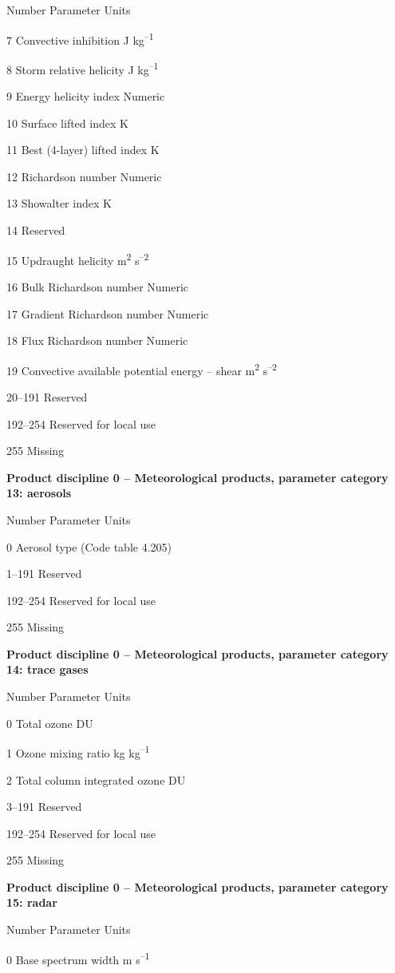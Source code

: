 Number Parameter Units

7 Convective inhibition J kg\textsuperscript{--1}

8 Storm relative helicity J kg\textsuperscript{--1}

9 Energy helicity index Numeric

10 Surface lifted index K

11 Best (4-layer) lifted index K

12 Richardson number Numeric

13 Showalter index K

14 Reserved

15 Updraught helicity m\textsuperscript{2} s\textsuperscript{--2}

16 Bulk Richardson number Numeric

17 Gradient Richardson number Numeric

18 Flux Richardson number Numeric

19 Convective available potential energy -- shear m\textsuperscript{2} s\textsuperscript{--2}

20--191 Reserved

192--254 Reserved for local use

255 Missing

\textbf{Product discipline 0 -- Meteorological products, parameter category 13: aerosols}

Number Parameter Units

0 Aerosol type (Code table 4.205)

1--191 Reserved

192--254 Reserved for local use

255 Missing

\textbf{Product discipline 0 -- Meteorological products, parameter category 14: trace gases}

Number Parameter Units

0 Total ozone DU

1 Ozone mixing ratio kg kg\textsuperscript{--1}

2 Total column integrated ozone DU

3--191 Reserved

192--254 Reserved for local use

255 Missing

\textbf{Product discipline 0 -- Meteorological products, parameter category 15: radar}

Number Parameter Units

0 Base spectrum width m s\textsuperscript{--1}

